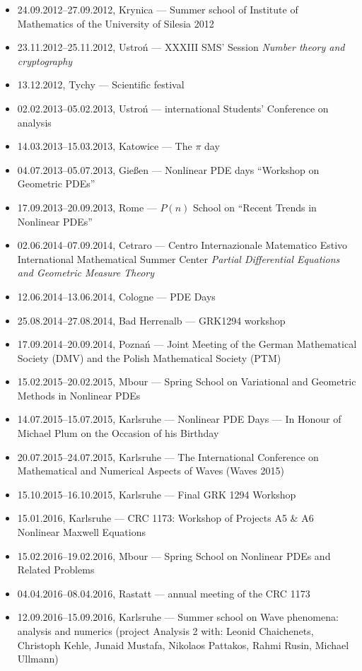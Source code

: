 \begin{itemize}
  \item 24.09.2012--27.09.2012, Krynica --- Summer school of Institute of Mathematics of the University of Silesia 2012
  \item 23.11.2012--25.11.2012, Ustroń --- XXXIII SMS' Session \textsl{Number theory and cryptography}
  \item 13.12.2012, Tychy --- Scientific festival
  \item 02.02.2013--05.02.2013, Ustroń ---  international Students' Conference on analysis
  \item 14.03.2013--15.03.2013, Katowice --- The $\pi$ day
  \item 04.07.2013--05.07.2013, Gießen --- Nonlinear PDE days ``Workshop on Geometric PDEs''
  \item 17.09.2013--20.09.2013, Rome --- $P(n)$ School on ``Recent Trends in Nonlinear PDEs''
  \item 02.06.2014--07.09.2014, Cetraro ---  Centro Internazionale Matematico Estivo International Mathematical Summer Center \textit{Partial Differential Equations and Geometric Measure Theory}
  \item 12.06.2014--13.06.2014, Cologne --- PDE Days
  \item 25.08.2014--27.08.2014, Bad Herrenalb --- GRK1294 workshop
  \item 17.09.2014--20.09.2014, Poznań --- Joint Meeting of the German Mathematical Society (DMV) and the Polish Mathematical Society (PTM)
  \item 15.02.2015--20.02.2015, Mbour --- Spring School on Variational and Geometric Methods in Nonlinear PDEs
  \item 14.07.2015--15.07.2015, Karlsruhe --- Nonlinear PDE Days --- In Honour of Michael Plum on the Occasion of his  Birthday
  \item 20.07.2015--24.07.2015, Karlsruhe --- The  International Conference on Mathematical and Numerical Aspects of Waves (Waves 2015)
  \item 15.10.2015--16.10.2015, Karlsruhe --- Final GRK 1294 Workshop
  \item 15.01.2016, Karlsruhe --- CRC 1173: Workshop of Projects A5 \& A6 Nonlinear Maxwell Equations
  \item 15.02.2016--19.02.2016, Mbour --- Spring School on Nonlinear PDEs and Related Problems
  \item 04.04.2016--08.04.2016, Rastatt ---  annual meeting of the CRC 1173
  \item 12.09.2016--15.09.2016, Karlsruhe --- Summer school on Wave phenomena: analysis and numerics (project Analysis 2 with: Leonid Chaichenets, Christoph Kehle, Junaid Mustafa, Nikolaos Pattakos, Rahmi Rusin, Michael Ullmann)

\end{itemize}
